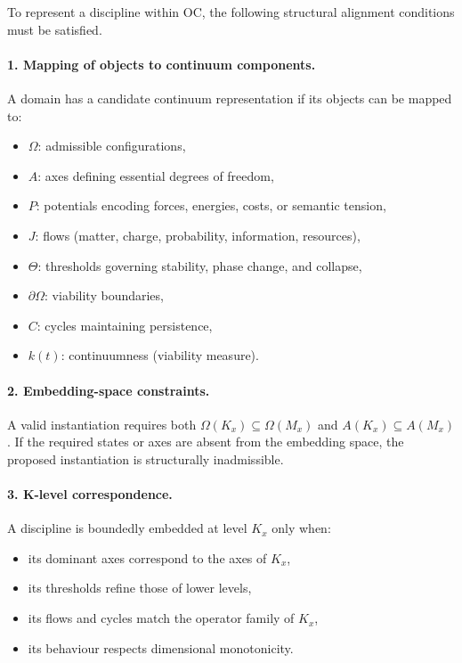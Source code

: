 To represent a discipline within OC, the following structural alignment
conditions must be satisfied.

\paragraph{1. Mapping of objects to continuum components.}
A domain has a candidate continuum representation if its objects can be mapped to:
\begin{itemize}
  \item \(\Omega\): admissible configurations,
  \item \(A\): axes defining essential degrees of freedom,
  \item \(P\): potentials encoding forces, energies, costs, or semantic tension,
  \item \(J\): flows (matter, charge, probability, information, resources),
  \item \(\Theta\): thresholds governing stability, phase change, and collapse,
  \item \(\partial\Omega\): viability boundaries,
  \item \(C\): cycles maintaining persistence,
  \item \(k(t)\): continuumness (viability measure).
\end{itemize}

\paragraph{2. Embedding-space constraints.}
A valid instantiation requires both
\(\Omega(K_x)\subseteq\Omega(M_x)\) and \(A(K_x)\subseteq A(M_x)\). If the
required states or axes are absent from the embedding space, the proposed
instantiation is structurally inadmissible.

\paragraph{3. K-level correspondence.}
A discipline is boundedly embedded at level \(K_x\) only when:
\begin{itemize}
  \item its dominant axes correspond to the axes of \(K_x\),
  \item its thresholds refine those of lower levels,
  \item its flows and cycles match the operator family of \(K_x\),
  \item its behaviour respects dimensional monotonicity.
\end{itemize}

